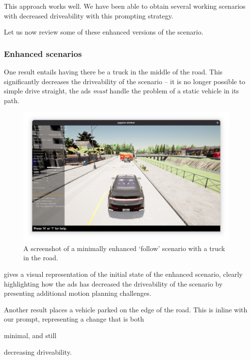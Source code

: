 This approach works well. We have been able to obtain several working scenarios with decreased
driveability with this prompting strategy.

Let us now review some of these enhanced versions of the scenario.

\subsubsection{Enhanced scenarios}

One result entails having there be a truck in the middle of the road. This significantly decreases
the driveability of the scenario -- it is no longer possible to simple drive straight, the
\acrshort{ads} \emph{must} handle the problem of a static vehicle in its path.


\begin{figure}[htb]
    \centering
    \includegraphics[width=\textwidth]{experiment-material/follow-minimally-enhanced-1-startpoint.png}
    \caption{A screenshot of a minimally enhanced `follow' scenario with a truck in the road.}\label{fig:followMinimallyEnhanced1StartPoint}
\end{figure}

 gives a visual representation of the initial state of
the enhanced scenario, clearly highlighting how the \acrshort{ads} has decreased the driveability of
the scenario by presenting additional motion planning challenges.

Another result  places a vehicle parked on the edge of
the road. This is inline with our prompt, representing a change that is both \begin{inparaenum}
    \item minimal, and still
    \item decreasing driveability.
\end{inparaenum}

